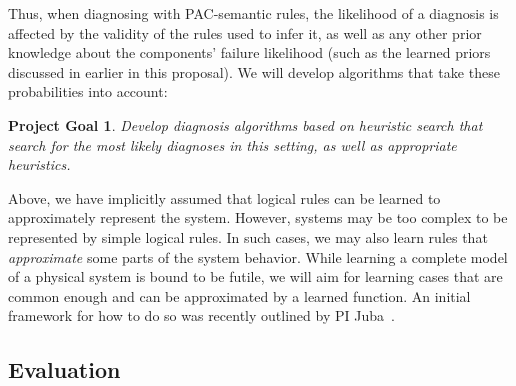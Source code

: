\documentclass[12pt]{article}
\newtheorem{problem}{Project Goal}
\begin{document}
Thus, when diagnosing with PAC-semantic rules,  the likelihood of a diagnosis is affected by  the validity of the rules used to infer it, as well as any other prior knowledge about the components' failure likelihood (such as the learned priors discussed in earlier in this proposal). We will develop algorithms that take these probabilities into account:
\begin{problem}
Develop diagnosis algorithms based on heuristic search that search for the most likely diagnoses in this setting, as well as appropriate heuristics.
\end{problem}
Above, we have implicitly assumed that logical rules can be learned to approximately represent the system. However, systems may be too complex to be represented by simple logical rules. In such cases, we may also learn rules that {\em approximate} some parts of the system behavior. While learning a complete model of a physical system is bound to be futile, we will aim for learning cases that are common enough and can be approximated by a learned function. An initial framework for how to do so was recently outlined by PI Juba~\cite{juba2016aaai,juba2016conditional}.






\subsection{Evaluation}
\label{sec:evaluation}
\end{document}
